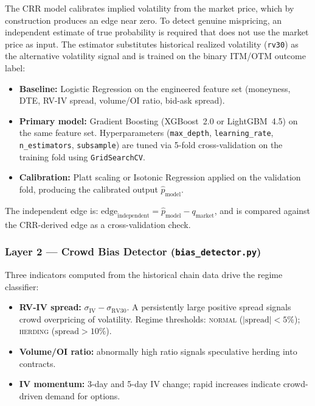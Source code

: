 \documentclass[12pt, letterpaper]{article}
\begin{document}
The CRR model calibrates implied volatility from the market price,
which by construction produces an edge near zero. To detect genuine
mispricing, an independent estimate of true probability is required
that does not use the market price as input. The estimator
substitutes historical realized volatility (\texttt{rv30}) as the
alternative volatility signal and is trained on the binary ITM/OTM
outcome label:

\begin{itemize}
  \item \textbf{Baseline:} Logistic Regression on the engineered
        feature set (moneyness, DTE, RV-IV spread, volume/OI ratio,
        bid-ask spread).
  \item \textbf{Primary model:} Gradient Boosting (XGBoost~2.0 or
        LightGBM~4.5) on the same feature set.
        Hyperparameters (\texttt{max\_depth},
        \texttt{learning\_rate}, \texttt{n\_estimators},
        \texttt{subsample}) are tuned via 5-fold cross-validation
        on the training fold using \texttt{GridSearchCV}.
  \item \textbf{Calibration:} Platt scaling or Isotonic Regression
        applied on the validation fold, producing the calibrated
        output $\hat{p}_{\text{model}}$.
\end{itemize}

The independent edge is:
$\text{edge}_{\text{independent}} = \hat{p}_{\text{model}} -
q_{\text{market}}$, and is compared against the CRR-derived edge
as a cross-validation check.

\subsubsection{Layer 2 --- Crowd Bias Detector
(\texttt{bias\_detector.py})}

Three indicators computed from the historical chain data drive the
regime classifier:

\begin{itemize}
  \item \textbf{RV-IV spread:} $\sigma_{\text{IV}} -
        \sigma_{\text{RV30}}$. A persistently large positive spread
        signals crowd overpricing of volatility. Regime thresholds:
        \textsc{normal} ($|\text{spread}| < 5\%$);
        \textsc{herding} ($\text{spread} > 10\%$).
  \item \textbf{Volume/OI ratio:} abnormally high ratio signals
        speculative herding into contracts.
  \item \textbf{IV momentum:} 3-day and 5-day IV change; rapid
        increases indicate crowd-driven demand for options.
\end{itemize}
\end{document}
